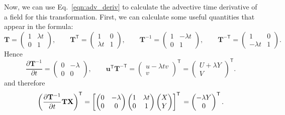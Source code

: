 \documentclass[11pt]{article}
\newcommand{\p}{\partial}
\newcommand{\bT}{\mathbf{T}}
\newcommand{\bX}{\mathbf{X}}
\newcommand{\bu}{\mathbf{u}}
\newcommand{\Trans}{\mathsf{T}}
\begin{document}
Now, we can use Eq.~\ref{eqn:adv_deriv} to calculate the advective time derivative of a field for this transformation. First, we can calculate some useful quantities that appear in the formula:
\begin{equation}
    \bT = \begin{pmatrix} 1 & \lambda t \\ 0 & 1 \end{pmatrix}, \qquad
    \bT^\Trans = \begin{pmatrix} 1 & 0 \\ \lambda t & 1 \end{pmatrix}, \qquad
    \bT^{-1} = \begin{pmatrix} 1 & -\lambda t \\ 0 & 1 \end{pmatrix}, \qquad
    \bT^{-\Trans} = \begin{pmatrix} 1 & 0 \\ -\lambda t & 1 \end{pmatrix}.
\end{equation}
Hence
\begin{equation}
\frac{\p \bT^{-1}}{\p t} = \begin{pmatrix} 0 & -\lambda \\ 0 & 0 \end{pmatrix}, \qquad
\bu^\Trans\bT^{-\Trans} = \begin{pmatrix} u - \lambda t v \\ v \end{pmatrix}^\Trans
=  \begin{pmatrix} U + \lambda Y \\ V \end{pmatrix}^\Trans.
\end{equation}
and therefore
\begin{equation}
\left(\frac{\p \bT^{-1}}{\p t}\bT\bX\right)^\Trans = \left[\begin{pmatrix} 0 & -\lambda \\ 0 & 0 \end{pmatrix}
\begin{pmatrix} 1 & \lambda t \\ 0 & 1 \end{pmatrix} \begin{pmatrix} X \\ Y \end{pmatrix} \right]^\Trans\\
= \begin{pmatrix} -\lambda Y \\ 0 \end{pmatrix}^\Trans.
\end{equation}
\end{document}
